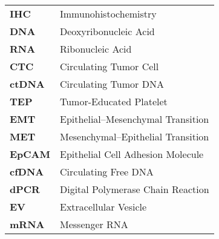 \begin{longtable}[l]{l l}
    \textbf{IHC} & Immunohistochemistry \\
    \textbf{DNA} & Deoxyribonucleic Acid \\
    \textbf{RNA} & Ribonucleic Acid \\
    \textbf{CTC} & Circulating Tumor Cell \\
    \textbf{ctDNA} & Circulating Tumor DNA \\
    \textbf{TEP} & Tumor-Educated Platelet \\
    \textbf{EMT} & Epithelial–Mesenchymal Transition \\ 
    \textbf{MET} & Mesenchymal–Epithelial Transition \\
    \textbf{EpCAM} & Epithelial Cell Adhesion Molecule \\
    \textbf{cfDNA} & Circulating Free DNA \\
    \textbf{dPCR} & Digital Polymerase Chain Reaction \\
    \textbf{EV} & Extracellular Vesicle \\
    \textbf{mRNA} & Messenger RNA \\
\end{longtable}

\normalsize